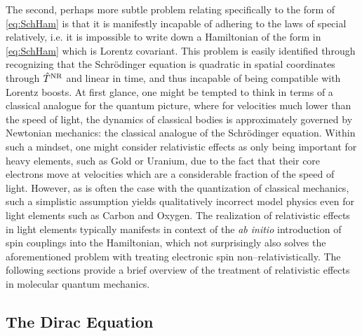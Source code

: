 The second, perhaps more subtle problem relating specifically to the form of \cref{eq:SchHam} is that it is manifestly
incapable of adhering to the laws of special relatively, i.e. it is impossible to write down a Hamiltonian of the form in
\cref{eq:SchHam} which is Lorentz covariant. This problem is easily identified through recognizing that the Schr\"{o}dinger
equation is quadratic in spatial coordinates through $\hat{T}^{\mathrm{NR}}$ and linear in time, and thus incapable of being compatible with Lorentz boosts. At first glance,
one might be tempted to think in terms of a classical analogue for the quantum picture, where for velocities much lower than the speed of light,
the dynamics of classical bodies is approximately governed by Newtonian mechanics: the classical analogue of the Schr\"{o}dinger equation.  Within such a mindset, one might consider
relativistic effects as only being important for heavy elements, such as Gold or Uranium, due to the fact that their core electrons
move at velocities which are a considerable fraction of the speed of light. However, as is often the case with the quantization
of classical mechanics, such a simplistic assumption yields qualitatively incorrect model physics even for light elements such as Carbon and Oxygen.
The realization of relativistic effects in light elements typically manifests in context of the \emph{ab initio} introduction of spin couplings
into the Hamiltonian, which not surprisingly also solves the aforementioned problem with treating electronic spin non--relativistically. 
The following sections provide a brief overview of the treatment of relativistic effects in molecular quantum mechanics.



\subsection{The Dirac Equation}

